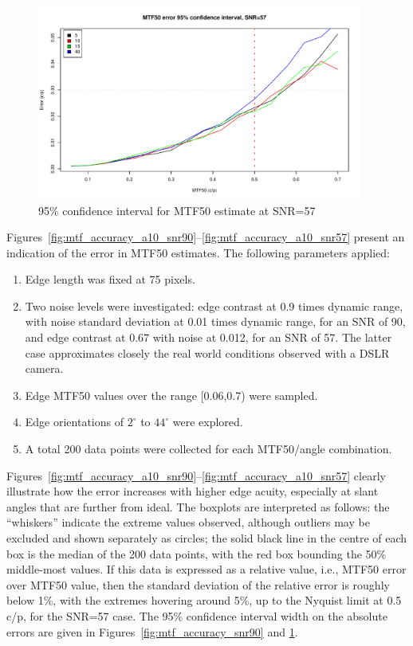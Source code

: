 \documentclass[a4paper]{article}
\begin{document}
\begin{figure}
\centering
\includegraphics[width=0.95\textwidth]{figures/accuracy_plot_57}
\caption{95\% confidence interval for MTF50 estimate at SNR=57}
\label{fig:mtf_accuracy_snr57}
\end{figure}


Figures~\ref{fig:mtf_accuracy_a10_snr90}--\ref{fig:mtf_accuracy_a10_snr57} present an indication of the error in MTF50
estimates. The following parameters applied:
\begin{enumerate}
  \item Edge length was fixed at 75 pixels.
  \item Two noise levels were investigated: edge contrast at 0.9 times
dynamic range, with noise standard deviation at 0.01 times dynamic range, for an SNR of 90, and
edge contrast at 0.67 with noise at 0.012, for an SNR of 57. The latter case
approximates closely the real world conditions observed with a DSLR camera.
  \item Edge MTF50 values over the range [0.06,0.7) were sampled.
  \item Edge orientations of $2^\circ$ to $44^\circ$ were
explored.
  \item A total 200 data points were collected for each MTF50/angle
combination.
\end{enumerate}
Figures~\ref{fig:mtf_accuracy_a10_snr90}--\ref{fig:mtf_accuracy_a10_snr57}
clearly illustrate how the error increases
with higher edge acuity, especially at slant angles that are further from
ideal. The boxplots are interpreted as follows: the ``whiskers'' indicate the
extreme values observed, although outliers may be excluded and shown
separately as circles; the solid black line in the centre of each box is the
median of the 200 data points, with the red box bounding the 50\%
middle-most values. If this data is expressed as a relative value, i.e., MTF50 error over MTF50
value, then the standard deviation of the relative error is roughly below
1\%, with the extremes hovering around 5\%, up to the Nyquist limit at 0.5
c/p, for the SNR=57 case. The 95\% confidence interval width on the absolute errors are given in
Figures~\ref{fig:mtf_accuracy_snr90} and \ref{fig:mtf_accuracy_snr57}.
\end{document}

